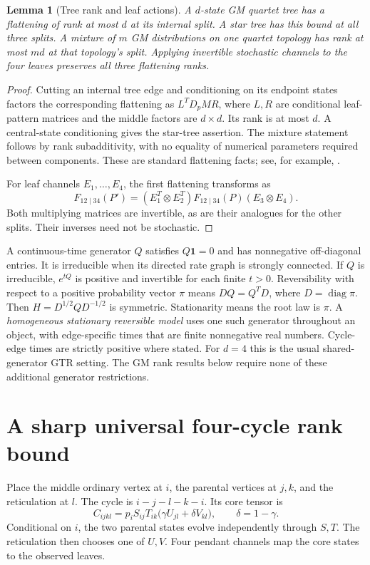 \documentclass[11pt]{article}
\newtheorem{lemma}[theorem]{Lemma}
\theoremstyle{definition}
\theoremstyle{remark}
\DeclareMathOperator{\diag}{diag}
\newcommand{\one}{\mathbf 1}
\begin{document}
\begin{lemma}[Tree rank and leaf actions]\label{lem:tree-rank}
A $d$-state GM quartet tree has a flattening of rank at most $d$ at its
internal split. A star tree has this bound at all three splits. A mixture
of $m$ GM distributions on one quartet topology has rank at most $md$ at
that topology's split. Applying invertible stochastic channels to the four
leaves preserves all three flattening ranks.
\end{lemma}
\begin{proof}
Cutting an internal tree edge and conditioning on its endpoint states
factors the corresponding flattening as $L^T D_p M R$, where $L,R$ are
conditional leaf-pattern matrices and the middle factors are
$d\times d$. Its rank is at most $d$. A central-state conditioning gives
the star-tree assertion. The mixture statement follows by rank
subadditivity, with no equality of numerical parameters required between
components. These are standard flattening facts; see, for example,
\cite{CFS2021,ARS2012,Snyman2023}.

For leaf channels $E_1,\ldots,E_4$, the first flattening transforms as
\[
 F_{12\mid34}(P')=(E_1^T\otimes E_2^T)
                       F_{12\mid34}(P)(E_3\otimes E_4).
\]
Both multiplying matrices are invertible, as are their analogues for the
other splits. Their inverses need not be stochastic.
\end{proof}

A continuous-time generator $Q$ satisfies $Q\one=0$ and has nonnegative
off-diagonal entries. It is irreducible when its directed rate graph is
strongly connected. If $Q$ is irreducible, $e^{tQ}$ is positive and
invertible for each finite $t>0$. Reversibility with respect to a positive
probability vector $\pi$ means $D Q=Q^T D$, where $D=\diag\pi$.
Then $H=D^{1/2}QD^{-1/2}$ is symmetric. Stationarity means the root
law is $\pi$. A \emph{homogeneous stationary reversible model} uses one
such generator throughout an object, with edge-specific times that are finite
nonnegative real numbers. Cycle-edge times are strictly positive where stated. For $d=4$
this is the usual shared-generator GTR setting. The GM rank results below
require none of these additional generator restrictions.

\section{A sharp universal four-cycle rank bound}\label{sec:rank}

Place the middle ordinary vertex at $i$, the parental vertices at $j,k$,
and the reticulation at $l$. The cycle is $i-j-l-k-i$. Its core tensor is
\begin{equation}\label{eq:core}
 C_{ijkl}=p_iS_{ij}T_{ik}\bigl(\gamma U_{jl}+\delta V_{kl}\bigr),
 \qquad\delta=1-\gamma.
\end{equation}
Conditional on $i$, the two parental states evolve independently through
$S,T$. The reticulation then chooses one of $U,V$. Four pendant channels
map the core states to the observed leaves.
\end{document}
